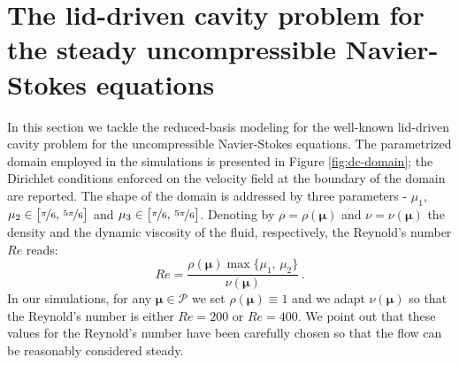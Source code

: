 \documentclass[12pt, a4paper, twoside, openright]{report}
\numberwithin{equation}{chapter}
\theoremstyle{theorem}
\theoremstyle{definition}
\theoremstyle{remark}
\theoremstyle{proposition}
\numberwithin{figure}{chapter}
\newcommand{\bg}[1]{\boldsymbol{#1}}
\begin{document}
\begin{figure}[H]
			
			\caption{}
			\label{}
		\end{figure}		
	
	\iffalse	
	\section{The lid-driven cavity problem for the steady uncompressible Navier-Stokes equations}
	\label{section:The lid-driven cavity problem for the steady uncompressible Navier-Stokes equations}
	
		In this section we tackle the reduced-basis modeling for the well-known lid-driven cavity problem for the uncompressible Navier-Stokes equations. The parametrized domain employed in the simulations is presented in Figure \ref{fig:dc-domain}; the Dirichlet conditions enforced on the velocity field at the boundary of the domain are reported. The shape of the domain is addressed by three parameters - $\mu_1$, $\mu_2 \in \big[ \nicefrac{\pi}{6}, \, \nicefrac{5 \pi}{6} \big]$ and $\mu_3 \in \big[ \nicefrac{\pi}{6}, \, \nicefrac{5 \pi}{6} \big]$.  Denoting by $\rho = \rho(\bg{\mu})$ and $\nu = \nu(\bg{\mu})$ the density and the dynamic viscosity of the fluid, respectively, the Reynold's number $Re$ reads:
		\begin{equation}
			Re = \dfrac{\rho(\bg{\mu}) \max \big\lbrace \mu_1, \, \mu_2 \big\rbrace}{\nu(\bg{\mu})} \, .
		\end{equation}
		In our simulations, for any $\bg{\mu} \in \mathcal{P}$ we set $\rho(\bg{\mu}) \equiv 1$ and we adapt $\nu(\bg{\mu})$ so that the Reynold's number is either $Re = 200$ or $Re = 400$. We point out that these values for the Reynold's number have been carefully chosen so that the flow can be reasonably considered steady.
		
\end{document}
